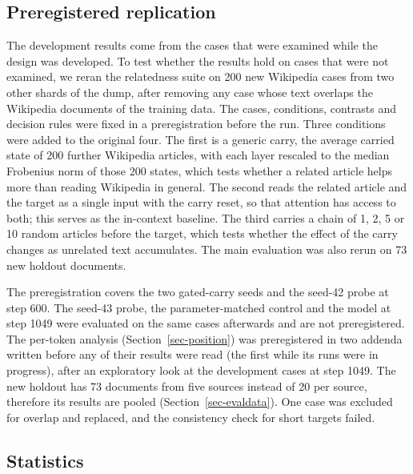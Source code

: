\documentclass[12pt,a4paper]{report}
\begin{document}
\subsection{Preregistered replication}
\label{sec-confirmatory-method}

The development results come from the cases that were examined while the design was developed. To test whether the results hold on cases that were not examined, we reran the relatedness suite on 200 new Wikipedia cases from two other shards of the dump, after removing any case whose text overlaps the Wikipedia documents of the training data.
The cases, conditions, contrasts and decision rules were fixed in a preregistration \citep{nosek2018preregistration} before the run. Three conditions were added to the original four. The first is a generic carry, the average carried state of 200 further Wikipedia articles, with each layer rescaled to the median Frobenius norm of those 200 states, which tests whether a related article helps more than reading Wikipedia in general. The second reads the related article and the target as a single input with the carry reset, so that attention has access to both; this serves as the in-context baseline. The third carries a chain of 1, 2, 5 or 10 random articles before the target, which tests whether the effect of the carry changes as unrelated text accumulates. The main evaluation was also rerun on 73 new holdout documents.

The preregistration covers the two gated-carry seeds and the seed-42 probe at step 600. The seed-43 probe, the parameter-matched control and the model at step 1049 were evaluated on the same cases afterwards and are not preregistered. The per-token analysis (Section~\ref{sec-position}) was preregistered in two addenda written before any of their results were read (the first while its runs were in progress), after an exploratory look at the development cases at step 1049. The new holdout has 73 documents from five sources instead of 20 per source, therefore its results are pooled (Section~\ref{sec-evaldata}). One case was excluded for overlap and replaced, and the consistency check for short targets failed. 



\subsection{Statistics}
\end{document}
